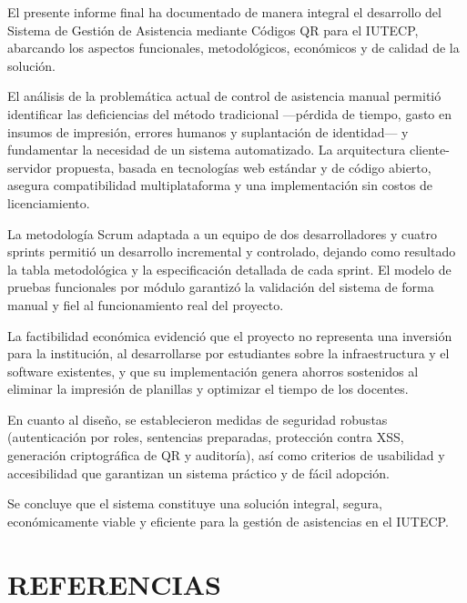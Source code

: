 \documentclass[12pt, letterpaper, oneside]{report}
\begin{document}
El presente informe final ha documentado de manera integral el desarrollo del Sistema de Gesti\'on de Asistencia mediante C\'odigos QR para el IUTECP, abarcando los aspectos funcionales, metodol\'ogicos, econ\'omicos y de calidad de la soluci\'on.

El an\'alisis de la problem\'atica actual de control de asistencia manual permiti\'o identificar las deficiencias del m\'etodo tradicional ---p\'erdida de tiempo, gasto en insumos de impresi\'on, errores humanos y suplantaci\'on de identidad--- y fundamentar la necesidad de un sistema automatizado. La arquitectura cliente-servidor propuesta, basada en tecnolog\'ias web est\'andar y de c\'odigo abierto, asegura compatibilidad multiplataforma y una implementaci\'on sin costos de licenciamiento.

La metodolog\'ia Scrum adaptada a un equipo de dos desarrolladores y cuatro sprints permiti\'o un desarrollo incremental y controlado, dejando como resultado la tabla metodol\'ogica y la especificaci\'on detallada de cada sprint. El modelo de pruebas funcionales por m\'odulo garantiz\'o la validaci\'on del sistema de forma manual y fiel al funcionamiento real del proyecto.

La factibilidad econ\'omica evidenci\'o que el proyecto no representa una inversi\'on para la instituci\'on, al desarrollarse por estudiantes sobre la infraestructura y el software existentes, y que su implementaci\'on genera ahorros sostenidos al eliminar la impresi\'on de planillas y optimizar el tiempo de los docentes.

En cuanto al dise\~no, se establecieron medidas de seguridad robustas (autenticaci\'on por roles, sentencias preparadas, protecci\'on contra XSS, generaci\'on criptogr\'afica de QR y auditor\'ia), as\'i como criterios de usabilidad y accesibilidad que garantizan un sistema pr\'actico y de f\'acil adopci\'on.

Se concluye que el sistema constituye una soluci\'on integral, segura, econ\'omicamente viable y eficiente para la gesti\'on de asistencias en el IUTECP.

\newpage

\chapter*{REFERENCIAS}
\end{document}
